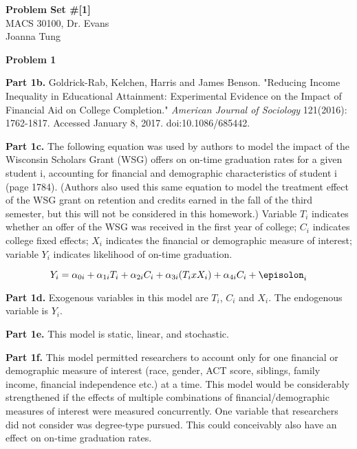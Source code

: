 \documentclass[letterpaper,12pt]{article}
\theoremstyle{definition}
\begin{document}
\begin{flushleft}
  \textbf{\large{Problem Set \#[1]}} \\
  MACS 30100, Dr. Evans \\
  Joanna Tung
\end{flushleft}

\vspace{5mm}

\noindent\textbf{Problem 1}

\noindent\newline\textbf{Part 1b.} Goldrick-Rab, Kelchen, Harris and James Benson. "Reducing Income Inequality in Educational Attainment: Experimental Evidence on the Impact of Financial Aid on College Completion." \textit{American Journal of Sociology} 121(2016): 1762-1817. Accessed January 8, 2017. doi:10.1086/685442.

\noindent\newline\textbf{Part 1c.} The following equation was used by authors to model the impact of the Wisconsin Scholars Grant (WSG) offers on on-time graduation rates for a given student i, accounting for financial and demographic characteristics of student i (page 1784). (Authors also used this same equation to model the treatment effect of the WSG grant on retention and credits earned in the fall of the third semester, but this will not be considered in this homework.) Variable \(T_i\) indicates whether an offer of the WSG was received in the first year of college; \(C_i\) indicates college fixed effects; \(X_i\) indicates the financial or demographic measure of interest; variable \(Y_i\) indicates likelihood of on-time graduation.

\begin{equation}
Y_i = \alpha_{0i} + \alpha_{1i}T_i + \alpha_{2i}C_i + \alpha_{3i}(T_i x X_i) + \alpha_{4i}C_i + \episolon_i
\end{equation}

\noindent\newline\textbf{Part 1d.} Exogenous variables in this model are \(T_i\), \(C_i\) and \(X_i\). The endogenous variable is \(Y_i\). 

\noindent\newline\textbf{Part 1e.} This model is static, linear, and stochastic.

\noindent\newline\textbf{Part 1f.} This model permitted researchers to account only for one financial or demographic measure of interest (race, gender, ACT score, siblings, family income, financial independence etc.) at a time. This model would be considerably strengthened if the effects of multiple combinations of financial/demographic measures of interest were measured concurrently. One variable that researchers did not consider was degree-type pursued. This could conceivably also have an effect on on-time graduation rates.
\end{document}
